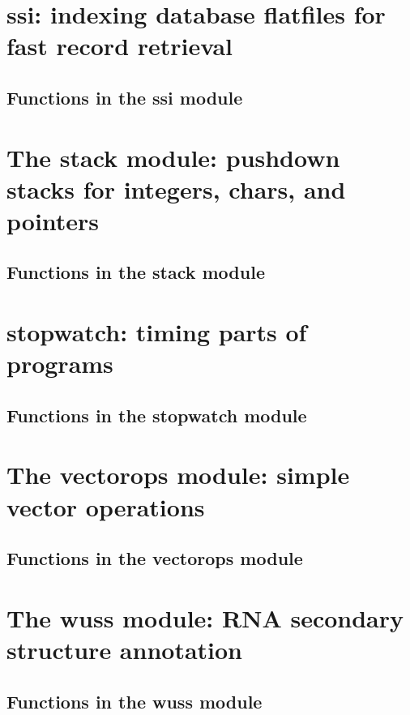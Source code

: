 \documentclass[11pt]{book}
\begin{document}
\newpage
\section{ssi: indexing database flatfiles for fast record retrieval}

\subsection{Functions in the ssi module}


\newpage
\section{The stack module: pushdown stacks for integers, chars, and pointers}

\subsection{Functions in the stack module}


\newpage
\section{stopwatch: timing parts of programs}

\subsection{Functions in the stopwatch module}


\newpage
\section{The vectorops module: simple vector operations}

\subsection{Functions in the vectorops module}


\newpage
\section{The wuss module: RNA secondary structure annotation}

\subsection{Functions in the wuss module}

\end{document}
